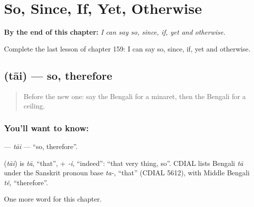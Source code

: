 
\chapter{So, Since, If, Yet, Otherwise}
\label{ch:bn-so-since-if-yet-otherwise}

\begin{chapteropening}
\textbf{By the end of this chapter:} \emph{I can say so, since, if, yet and otherwise.}

Complete the last lesson of chapter 159: I can say so, since, if, yet and otherwise.
\end{chapteropening}

\section[\texorpdfstring{\bn{তাই} (tāi)}{তাই (tāi)}]{ (tāi) — so, therefore}

\label{lesson:BN-C159-tai}



\begin{quote}
Before the new one: say the Bengali for a minaret, then the Bengali for a ceiling.
\end{quote}

\subsection*{You'll want to know: }
\textbf{} — \emph{tāi} — \textquotedblleft{}so, therefore\textquotedblright{}.

\begin{cousinweb}
\textbf{} (\emph{tāi}) is \emph{tā}, \textquotedblleft{}that\textquotedblright{}, + \emph{-i}, \textquotedblleft{}indeed\textquotedblright{}: \textquotedblleft{}that very thing, so\textquotedblright{}. CDIAL lists Bengali \emph{tā} under the Sanskrit pronoun base \emph{ta-}, \textquotedblleft{}that\textquotedblright{} (CDIAL 5612), with Middle Bengali \emph{tẽ}, \textquotedblleft{}therefore\textquotedblright{}.
\end{cousinweb}

\begin{grammarlens}[title={What you've built}]
One more word for this chapter.
\end{grammarlens}

